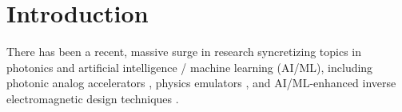 \documentclass{article}
\begin{document}
\section{Introduction}
There has been a recent, massive surge in research syncretizing topics in photonics and artificial intelligence / machine learning (AI/ML), including photonic analog accelerators \cite{shen_deep_2016, inagaki_coherent_2016, harris_quantum_2017, yamamoto_coherent_2017, khoram_nanophotonic_2018, hughes_wave_2019,  shastri_photonics_2021,  xu_11_2021}, physics emulators \cite{raissi_physics-informed_2019, gostimirovic_open-source_2019, guo_solving_2020, chen_physics-informed_2020, pestourie_active_2020, ghosh_machine_2021, lu_physics-informed_2021}, and AI/ML-enhanced inverse electromagnetic design techniques \cite{trivedi_data-driven_2019, qu_migrating_2019, melati_mapping_2019,tahersima_deep_2019, demeter-finzi_s-matrix_2019,dezfouli_design_2021,elsawy_global_2019, hammond_designing_2019,  jiang_global_2019, jiang_simulator-based_2020,jiang_multiobjective_2020, jiang_deep_2020,   hegde_deep_2020,   minkov_inverse_2020,  so_deep_2020,ma_parameter_2020,   kojima_deep_2021, lu_physics-informed_2021, ma_deep_2021,  melati_design_2021,  hegde_sample-efficient_2021}.  
\end{document}
